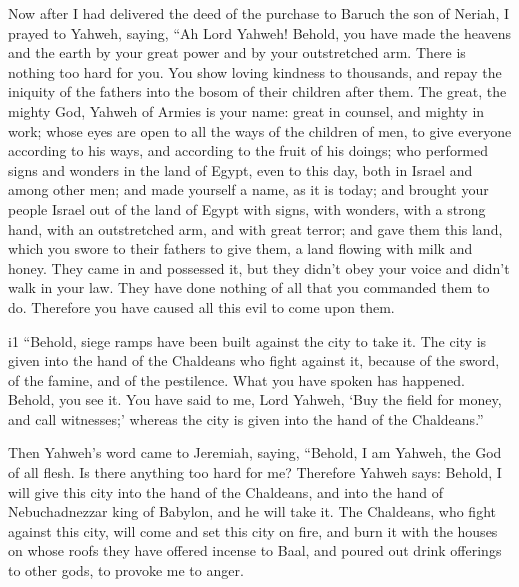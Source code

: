  Now after I had delivered the deed of the purchase to
Baruch the son of Neriah, I prayed to Yahweh, saying, 
``Ah Lord Yahweh! Behold, you have made the heavens and the earth by
your great power and by your outstretched arm. There is nothing too hard
for you.  You show loving kindness to thousands, and
repay the iniquity of the fathers into the bosom of their children after
them. The great, the mighty God, Yahweh of Armies is your name:
 great in counsel, and mighty in work; whose eyes are
open to all the ways of the children of men, to give everyone according
to his ways, and according to the fruit of his doings; 
who performed signs and wonders in the land of Egypt, even to this day,
both in Israel and among other men; and made yourself a name, as it is
today;  and brought your people Israel out of the land of
Egypt with signs, with wonders, with a strong hand, with an outstretched
arm, and with great terror;  and gave them this land,
which you swore to their fathers to give them, a land flowing with milk
and honey.  They came in and possessed it, but they
didn't obey your voice and didn't walk in your law. They have done
nothing of all that you commanded them to do. Therefore you have caused
all this evil to come upon them.

i1 ``Behold, siege ramps have been built against the city
to take it. The city is given into the hand of the Chaldeans who fight
against it, because of the sword, of the famine, and of the pestilence.
What you have spoken has happened. Behold, you see it. 
You have said to me, Lord Yahweh, `Buy the field for money, and call
witnesses;' whereas the city is given into the hand of the Chaldeans.''

 Then Yahweh's word came to Jeremiah, saying,
 ``Behold, I am Yahweh, the God of all flesh. Is there
anything too hard for me?  Therefore Yahweh says: Behold,
I will give this city into the hand of the Chaldeans, and into the hand
of Nebuchadnezzar king of Babylon, and he will take it. 
The Chaldeans, who fight against this city, will come and set this city
on fire, and burn it with the houses on whose roofs they have offered
incense to Baal, and poured out drink offerings to other gods, to
provoke me to anger.

